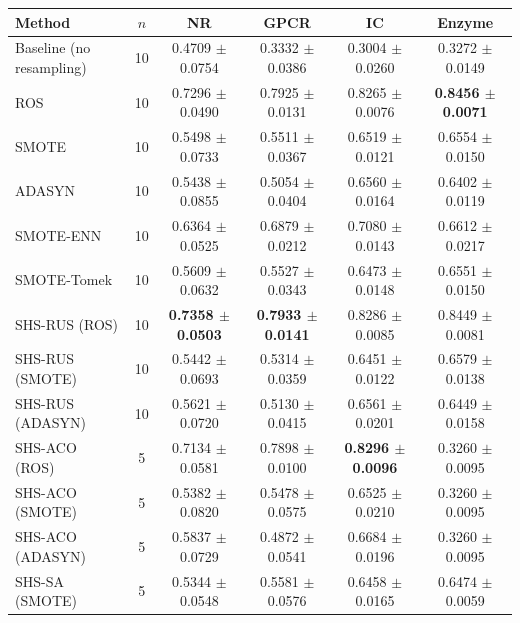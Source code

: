 \begin{tabular}{lccccc}
\toprule
Method & $n$ & NR & GPCR & IC & Enzyme \\
\midrule
Baseline (no resampling) & 10 & 0.4709 $\pm$ 0.0754 & 0.3332 $\pm$ 0.0386 & 0.3004 $\pm$ 0.0260 & 0.3272 $\pm$ 0.0149 \\
ROS & 10 & 0.7296 $\pm$ 0.0490 & 0.7925 $\pm$ 0.0131 & 0.8265 $\pm$ 0.0076 & \textbf{0.8456 $\pm$ 0.0071} \\
SMOTE & 10 & 0.5498 $\pm$ 0.0733 & 0.5511 $\pm$ 0.0367 & 0.6519 $\pm$ 0.0121 & 0.6554 $\pm$ 0.0150 \\
ADASYN & 10 & 0.5438 $\pm$ 0.0855 & 0.5054 $\pm$ 0.0404 & 0.6560 $\pm$ 0.0164 & 0.6402 $\pm$ 0.0119 \\
SMOTE-ENN & 10 & 0.6364 $\pm$ 0.0525 & 0.6879 $\pm$ 0.0212 & 0.7080 $\pm$ 0.0143 & 0.6612 $\pm$ 0.0217 \\
SMOTE-Tomek & 10 & 0.5609 $\pm$ 0.0632 & 0.5527 $\pm$ 0.0343 & 0.6473 $\pm$ 0.0148 & 0.6551 $\pm$ 0.0150 \\
SHS-RUS (ROS) & 10 & \textbf{0.7358 $\pm$ 0.0503} & \textbf{0.7933 $\pm$ 0.0141} & 0.8286 $\pm$ 0.0085 & 0.8449 $\pm$ 0.0081 \\
SHS-RUS (SMOTE) & 10 & 0.5442 $\pm$ 0.0693 & 0.5314 $\pm$ 0.0359 & 0.6451 $\pm$ 0.0122 & 0.6579 $\pm$ 0.0138 \\
SHS-RUS (ADASYN) & 10 & 0.5621 $\pm$ 0.0720 & 0.5130 $\pm$ 0.0415 & 0.6561 $\pm$ 0.0201 & 0.6449 $\pm$ 0.0158 \\
SHS-ACO (ROS) & 5 & 0.7134 $\pm$ 0.0581 & 0.7898 $\pm$ 0.0100 & \textbf{0.8296 $\pm$ 0.0096} & 0.3260 $\pm$ 0.0095 \\
SHS-ACO (SMOTE) & 5 & 0.5382 $\pm$ 0.0820 & 0.5478 $\pm$ 0.0575 & 0.6525 $\pm$ 0.0210 & 0.3260 $\pm$ 0.0095 \\
SHS-ACO (ADASYN) & 5 & 0.5837 $\pm$ 0.0729 & 0.4872 $\pm$ 0.0541 & 0.6684 $\pm$ 0.0196 & 0.3260 $\pm$ 0.0095 \\
SHS-SA (SMOTE) & 5 & 0.5344 $\pm$ 0.0548 & 0.5581 $\pm$ 0.0576 & 0.6458 $\pm$ 0.0165 & 0.6474 $\pm$ 0.0059 \\
\bottomrule
\end{tabular}
